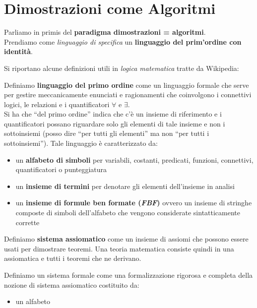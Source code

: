 \documentclass[a4paper,12pt, oneside]{book}
\begin{document}
\chapter{Dimostrazioni come Algoritmi}
Parliamo in primis del \textbf{paradigma dimostrazioni = algoritmi}.\\
Prendiamo come \textit{linguaggio di specifica} un \textbf{linguaggio
  del prim'ordine con identità}.
\begin{shaded}
  Si riportano alcune definizioni utili in \textit{logica matematica} tratte da
  Wikipedia: 
  \begin{definizione}
    Definiamo \textbf{linguaggio del primo ordine} come un linguaggio formale
    che serve per gestire meccanicamente enunciati e ragionamenti che
    coinvolgono i connettivi logici, le relazioni e i quantificatori $\forall$ e
    $\exists$.\\
    Si ha che ``del primo ordine'' indica che c'è un insieme di riferimento e i
    quantificatori possano riguardare solo gli elementi di tale insieme e non i
    sottoinsiemi (posso dire ``per tutti gli elementi'' ma non ``per tutti i
    sottoinsiemi''). Tale linguaggio è caratterizzato da:
    \begin{itemize}
      \item un \textbf{alfabeto di simboli} per variabili, costanti, predicati,
      funzioni, connettivi, quantificatori o punteggiatura 
      \item un \textbf{insieme di termini} per denotare gli elementi
      dell'insieme in analisi
      \item un \textbf{insieme di formule ben formate (\textit{FBF})} ovvero un
      insieme di stringhe composte di simboli dell'alfabeto che vengono
      considerate sintatticamente corrette 
    \end{itemize}
  \end{definizione}
  \begin{definizione}
    Definiamo \textbf{sistema assiomatico} come un insieme di assiomi che
    possono essere usati per dimostrare teoremi. Una teoria matematica consiste
    quindi in una assiomatica e tutti i teoremi che ne derivano.  
  \end{definizione}
  \begin{definizione}
    Definiamo un sistema formale come una formalizzazione rigorosa e completa
    della nozione di sistema assiomatico costituito da:
    \begin{itemize}
      \item un alfabeto

\end{itemize}
\end{definizione}
\end{shaded}
\end{document}
